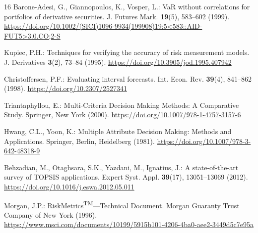 \documentclass[runningheads]{llncs}
\begin{document}
\begin{thebibliography}{16}
Barone-Adesi, G., Giannopoulos, K., Vosper, L.: VaR without correlations
for portfolios of derivative securities. J. Futures Mark. \textbf{19}(5),
583--602 (1999).
\url{https://doi.org/10.1002/(SICI)1096-9934(199908)19:5<583::AID-FUT5>3.0.CO;2-S}

Kupiec, P.H.: Techniques for verifying the accuracy of risk measurement
models. J. Derivatives \textbf{3}(2), 73--84 (1995).
\url{https://doi.org/10.3905/jod.1995.407942}

Christoffersen, P.F.: Evaluating interval forecasts. Int. Econ. Rev.
\textbf{39}(4), 841--862 (1998).
\url{https://doi.org/10.2307/2527341}

Triantaphyllou, E.: Multi-Criteria Decision Making Methods: A Comparative
Study. Springer, New York (2000).
\url{https://doi.org/10.1007/978-1-4757-3157-6}

Hwang, C.L., Yoon, K.: Multiple Attribute Decision Making: Methods and
Applications. Springer, Berlin, Heidelberg (1981).
\url{https://doi.org/10.1007/978-3-642-48318-9}

Behzadian, M., Otaghsara, S.K., Yazdani, M., Ignatius, J.: A
state-of-the-art survey of TOPSIS applications. Expert Syst. Appl.
\textbf{39}(17), 13051--13069 (2012).
\url{https://doi.org/10.1016/j.eswa.2012.05.011}

Morgan, J.P.: RiskMetrics\textsuperscript{TM}---Technical Document. Morgan Guaranty Trust Company of New York (1996).
\url{https://www.msci.com/documents/10199/5915b101-4206-4ba0-aee2-3449d5c7e95a}

\end{thebibliography}
\end{document}
